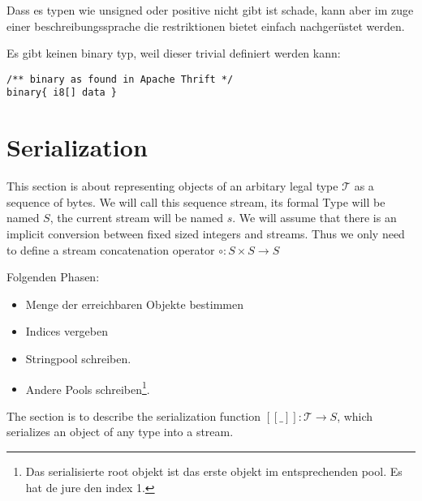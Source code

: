 \documentclass[a4paper,10pt]{article}
\newcommand{\den}[1]{[\![#1]\!]}
\begin{document}
Dass es typen wie unsigned oder positive nicht gibt ist schade, kann aber im zuge einer beschreibungssprache die restriktionen bietet einfach nachgerüstet werden.

Es gibt keinen binary typ, weil dieser trivial definiert werden kann:
\begin{verbatim}
/** binary as found in Apache Thrift */
binary{ i8[] data }
\end{verbatim}


\section{Serialization}

This section is about representing objects of an arbitary legal type $\mathcal{T}$ as a sequence of bytes. We will call this sequence stream, its formal Type will be named $S$, the current stream will be named $s$. We will assume that there is an implicit conversion between fixed sized integers and streams. Thus we only need to define a stream concatenation operator $\circ : S \times S → S$

Folgenden Phasen:
\begin{itemize}
 \item Menge der erreichbaren Objekte bestimmen
 \item Indices vergeben
 \item Stringpool schreiben.
 \item Andere Pools schreiben\footnote{Das serialisierte root objekt ist das erste objekt im entsprechenden pool. Es hat de jure den index 1.}.
\end{itemize}

The section is to describe the serialization function $\den{\_}:\mathcal{T} → S$, which serializes an object of any type into a stream.
\end{document}
